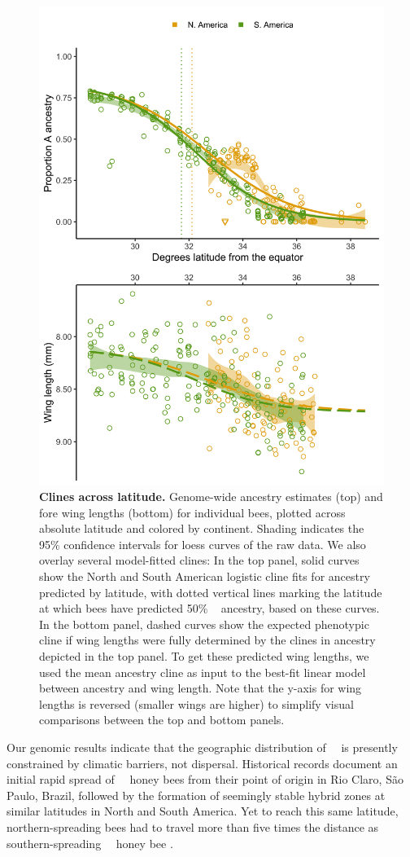 \begin{figure}[p]
\includegraphics[width = .62\textwidth]{chapter1/figures/A_and_wing_clines.png}
\caption{ \textbf{Clines across latitude.}
Genome-wide ancestry estimates (top) and fore wing lengths (bottom) for individual bees, plotted across absolute latitude and colored by continent. Shading indicates the 95\% confidence intervals for loess curves of the raw data. We also overlay several model-fitted clines: In the top panel, solid curves show the North and South American logistic cline fits for ancestry predicted by latitude, with dotted vertical lines marking the latitude at which bees have predicted 50\% \scutellata\  ancestry, based on these curves.  In the bottom panel, dashed curves show the expected phenotypic cline if wing lengths were fully determined by the clines in ancestry depicted in the top panel. To get these predicted wing lengths, we used the mean ancestry cline as input to the best-fit linear model between ancestry and wing length. Note that the y-axis for wing lengths is reversed (smaller wings are higher) to simplify visual comparisons between the top and bottom panels.}
\label{parallel_clines}
\end{figure}

Our genomic results indicate that the geographic distribution of \scutellata\ \anc\ is presently constrained by climatic barriers, not dispersal. Historical records document an initial rapid spread of \africanized\ \hyb\ honey bees from their point of origin in Rio Claro, São Paulo, Brazil, followed by the formation of seemingly stable hybrid zones at similar latitudes in North and South America. Yet to reach this same latitude, northern-spreading bees had to travel more than five times the distance as southern-spreading \africanized\ \hyb\ honey bee .

